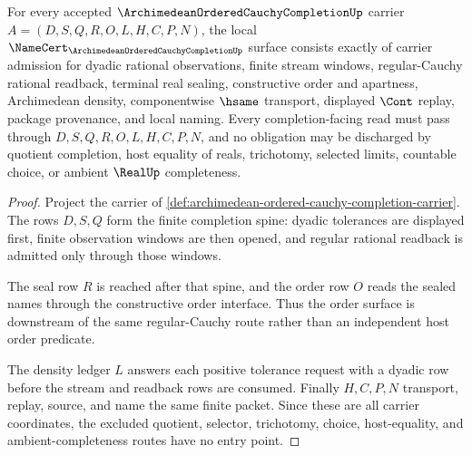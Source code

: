 \begin{theorem}
\label{thm:archimedean-ordered-cauchy-completion-namecert-obligations}
For every accepted $\ArchimedeanOrderedCauchyCompletionUp$ carrier $A=(D,S,Q,R,O,L,H,C,P,N)$, the local $\NameCert_{\ArchimedeanOrderedCauchyCompletionUp}$ surface consists exactly of carrier admission for dyadic rational observations, finite stream windows, regular-Cauchy rational readback, terminal real sealing, constructive order and apartness, Archimedean density, componentwise $\hsame$ transport, displayed $\Cont$ replay, package provenance, and local naming. Every completion-facing read must pass through $D,S,Q,R,O,L,H,C,P,N$, and no obligation may be discharged by quotient completion, host equality of reals, trichotomy, selected limits, countable choice, or ambient $\RealUp$ completeness.
\end{theorem}
\begin{proof}
Project the carrier of \autoref{def:archimedean-ordered-cauchy-completion-carrier}. The rows $D,S,Q$ form the finite completion spine: dyadic tolerances are displayed first, finite observation windows are then opened, and regular rational readback is admitted only through those windows.

The seal row $R$ is reached after that spine, and the order row $O$ reads the sealed names through the constructive order interface. Thus the order surface is downstream of the same regular-Cauchy route rather than an independent host order predicate.

The density ledger $L$ answers each positive tolerance request with a dyadic row before the stream and readback rows are consumed. Finally $H,C,P,N$ transport, replay, source, and name the same finite packet. Since these are all carrier coordinates, the excluded quotient, selector, trichotomy, choice, host-equality, and ambient-completeness routes have no entry point.
\end{proof}

